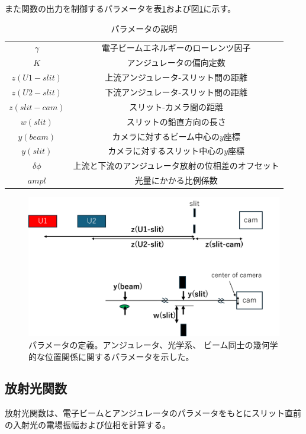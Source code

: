 \documentclass[a4paper,11pt,uplatex]{jsbook}
\begin{document}
また関数の出力を制御するパラメータを表\ref{tab:prm}および図\ref{prm}に示す。
\begin{table}[h]
  \centering
  \begin{tabular}{c|c}
    $\gamma$ & 電子ビームエネルギーのローレンツ因子 \\
    $K$ & アンジュレータの偏向定数 \\
    $z(U1-slit)$ & 上流アンジュレータ-スリット間の距離\\
    $z(U2-slit)$ & 下流アンジュレータ-スリット間の距離 \\
    $z(slit-cam)$ & スリット-カメラ間の距離 \\
    $w(slit)$ & スリットの鉛直方向の長さ \\
    $y(beam)$ & カメラに対するビーム中心の$y$座標 \\
    $y(slit)$ & カメラに対するスリット中心の$y$座標 \\
    $\delta \phi$ & 上流と下流のアンジュレータ放射の位相差のオフセット\\
    $ampl$ & 光量にかかる比例係数
  \end{tabular}
  \caption[パラメータの説明]{パラメータの説明}\label{tab:prm}
\end{table}
  
\begin{figure}[h]
  \centering
  \includegraphics[width=0.8\linewidth]{image/4-prm.png}
  \caption[パラメータの定義]{パラメータの定義。アンジュレータ、光学系、
  ビーム同士の幾何学的な位置関係に関するパラメータを示した。}\label{prm}
\end{figure}

\subsection{放射光関数}
放射光関数は、電子ビームとアンジュレータのパラメータをもとにスリット直前の入射光の電場振幅および位相を計算する。
\end{document}
